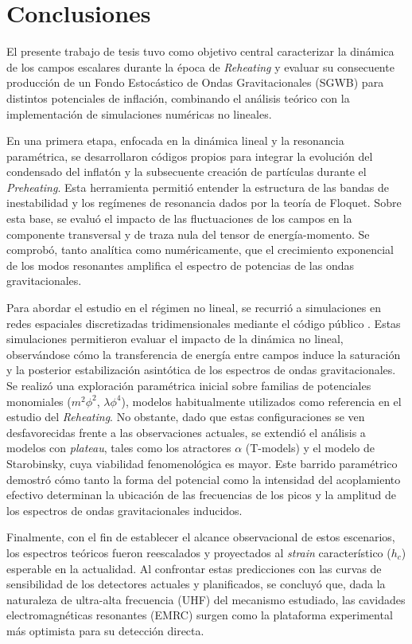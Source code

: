 \chapter{Conclusiones}
\label{cap:conclusiones}

El presente trabajo de tesis tuvo como objetivo central caracterizar la dinámica de los campos escalares durante la época de \textit{Reheating} y evaluar su consecuente producción de un Fondo Estocástico de Ondas Gravitacionales (SGWB) para distintos potenciales de inflación, combinando el análisis teórico con la implementación de simulaciones numéricas no lineales.

En una primera etapa, enfocada en la dinámica lineal y la resonancia paramétrica, se desarrollaron códigos propios para integrar la evolución del condensado del inflatón y la subsecuente creación de partículas durante el \textit{Preheating}. Esta herramienta permitió entender la estructura de las bandas de inestabilidad y los regímenes de resonancia dados por la teoría de Floquet. Sobre esta base, se evaluó el impacto de las fluctuaciones de los campos en la componente transversal y de traza nula del tensor de energía-momento. Se comprobó, tanto analítica como numéricamente, que el crecimiento exponencial de los modos resonantes amplifica el espectro de potencias de las ondas gravitacionales.

Para abordar el estudio en el régimen no lineal, se recurrió a simulaciones en redes espaciales discretizadas tridimensionales mediante el código público \CosmoLattice. Estas simulaciones permitieron evaluar el impacto de la dinámica no lineal, observándose cómo la transferencia de energía entre campos induce la saturación y la posterior estabilización asintótica de los espectros de ondas gravitacionales. Se realizó una exploración paramétrica inicial sobre familias de potenciales monomiales ($m^2\phi^2$, $\lambda\phi^4$), modelos habitualmente utilizados como referencia en el estudio del \textit{Reheating}. No obstante, dado que estas configuraciones se ven desfavorecidas frente a las observaciones actuales, se extendió el análisis a modelos con \textit{plateau}, tales como los atractores $\alpha$ (T-models) y el modelo de Starobinsky, cuya viabilidad fenomenológica es mayor. Este barrido paramétrico demostró cómo tanto la forma del potencial como la intensidad del acoplamiento efectivo determinan la ubicación de las frecuencias de los picos y la amplitud de los espectros de ondas gravitacionales inducidos.

Finalmente, con el fin de establecer el alcance observacional de estos escenarios, los espectros teóricos fueron reescalados y proyectados al \textit{strain} característico ($h_c$) esperable en la actualidad. Al confrontar estas predicciones con las curvas de sensibilidad de los detectores actuales y planificados, se concluyó que, dada la naturaleza de ultra-alta frecuencia (UHF) del mecanismo estudiado, las cavidades electromagnéticas resonantes (EMRC) surgen como la plataforma experimental más optimista para su detección directa.

